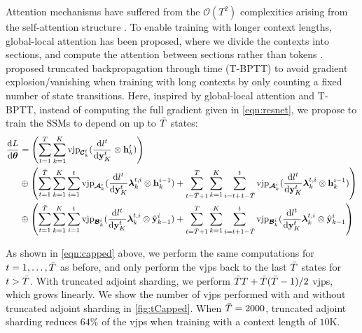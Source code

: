 \documentclass{article}
\newcommand{\A}{\mathcal{A}}
\newcommand{\B}{\mathcal{B}}
\newcommand{\C}{\mathcal{C}}
\newcommand{\ssm}{\mathrm{SSM}}
\newcommand{\vjp}{\mathrm{vjp}}
\newcommand{\diff}{\mathrm{d}}
\newcommand{\blambda}{\boldsymbol{\lambda}}
\begin{document}
Attention mechanisms have suffered from the $\mathcal{O}(T^2)$ complexities arising from the self-attention structure \citep{vaswani2023attentionneed}. To enable training with longer context lengths, global-local attention has been proposed, where we divide the contexts into sections, and compute the attention between sections rather than tokens \citep{yang2021focal}. \citep{tallec2017unbiasingtruncatedbackpropagationtime} proposed truncated backpropagation through time (T-BPTT) to avoid gradient explosion/vanishing when training with long contexts by only counting a fixed number of state transitions. Here, inspired by global-local attention and T-BPTT, instead of computing the full gradient given in \autoref{eqn:resnet}, we propose to train the $\ssm$s to depend on up to $\Bar{T}$ states:
\begin{equation}
\label{eqn:capped}
\begin{split}
    \frac{\diff L}{\diff \boldsymbol{\theta}} &= \left(\sum_{t=1}^T\sum_{k=1}^K \vjp_{\boldsymbol{\C}^t_k}(\frac{\diff l^t}{\diff \mathbf{y}_K^t}\otimes \mathbf{h}^t_k) \right) \\
     &\oplus \left(\sum_{t=1}^{\Bar{T}}\sum_{k=1}^K \sum_{i=1}^{t}\vjp_{\boldsymbol{\A}^i_k}(\frac{\diff l^t}{\diff \mathbf{y}_K^t}\blambda^{t,i}_k\otimes \mathbf{h}^{i-1}_k) + \sum_{t=\Bar{T}+1}^{T}\sum_{k=1}^K \sum_{i=t+1-\Bar{T}}^{t}\vjp_{\boldsymbol{\A}^i_k}(\frac{\diff l^t}{\diff \mathbf{y}_K ^t}\blambda^{t,i}_k\otimes \mathbf{h}^{i-1}_k)\right) \\
     &\oplus \left(\sum_{t=1}^{\Bar{T}}\sum_{k=1}^K \sum_{i=1}^{t}\vjp_{\boldsymbol{\B}^i_k}(\frac{\diff l^t}{\diff \mathbf{y}_K^t}\blambda^{t,i}_k\otimes \hat{\mathbf{y}}^i_{k-1}) + \sum_{t=\Bar{T}+1}^{T}\sum_{k=1}^K \sum_{i=t+1-\Bar{T}}^{t}\vjp_{\boldsymbol{\B}^i_k}(\frac{\diff l^t}{\diff \mathbf{y}_K^t}\blambda^{t,i}_k\otimes \hat{\mathbf{y}}^i_{k-1}\right)
\end{split}
\end{equation}

As shown in \autoref{eqn:capped} above, we perform the same computations for $t=1,\dots,\Bar{T}$ as before, and only perform the $\vjp$s back to the last $\Bar{T}$ states for $t>\Bar{T}$. With truncated adjoint sharding, we perform $\Bar{T} T+ \Bar{T}(\Bar{T}-1)/2$ $\vjp$s, which grows linearly. We show the number of $\vjp$s performed with and without truncated adjoint sharding in \autoref{fig:tCapped}. When $\Bar{T}=2000$, truncated adjoint sharding reduces  $64\%$ of the $\vjp$s when training with a context length of $10\mathrm{K}$.
\end{document}
